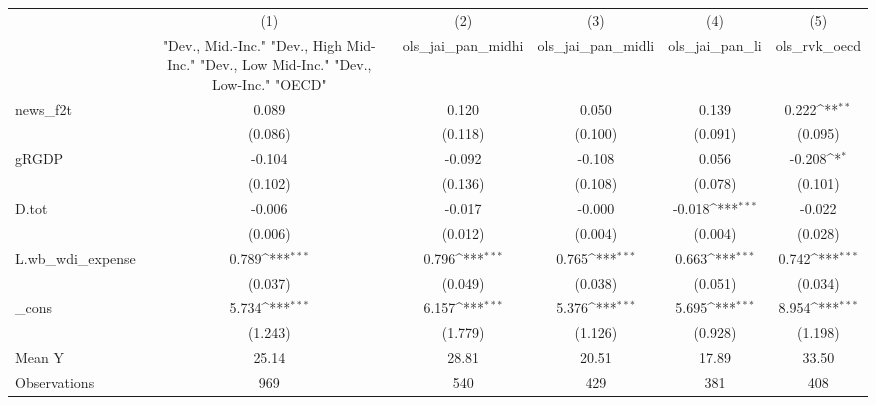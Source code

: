 {
\def\sym#1{\ifmmode^{#1}\else\(^{#1}\)\fi}
\begin{tabular}{l*{5}{c}}
\toprule
            &\multicolumn{1}{c}{(1)}&\multicolumn{1}{c}{(2)}&\multicolumn{1}{c}{(3)}&\multicolumn{1}{c}{(4)}&\multicolumn{1}{c}{(5)}\\
            &\multicolumn{1}{c}{ "Dev., Mid.-Inc." "Dev., High Mid-Inc." "Dev., Low Mid-Inc." "Dev., Low-Inc." "OECD" }&\multicolumn{1}{c}{ols\_jai\_pan\_midhi}&\multicolumn{1}{c}{ols\_jai\_pan\_midli}&\multicolumn{1}{c}{ols\_jai\_pan\_li}&\multicolumn{1}{c}{ols\_rvk\_oecd}\\
\midrule
news\_f2t    &       0.089         &       0.120         &       0.050         &       0.139         &       0.222\sym{**} \\
            &     (0.086)         &     (0.118)         &     (0.100)         &     (0.091)         &     (0.095)         \\
\addlinespace
gRGDP       &      -0.104         &      -0.092         &      -0.108         &       0.056         &      -0.208\sym{*}  \\
            &     (0.102)         &     (0.136)         &     (0.108)         &     (0.078)         &     (0.101)         \\
\addlinespace
D.tot       &      -0.006         &      -0.017         &      -0.000         &      -0.018\sym{***}&      -0.022         \\
            &     (0.006)         &     (0.012)         &     (0.004)         &     (0.004)         &     (0.028)         \\
\addlinespace
L.wb\_wdi\_expense&       0.789\sym{***}&       0.796\sym{***}&       0.765\sym{***}&       0.663\sym{***}&       0.742\sym{***}\\
            &     (0.037)         &     (0.049)         &     (0.038)         &     (0.051)         &     (0.034)         \\
\addlinespace
\_cons      &       5.734\sym{***}&       6.157\sym{***}&       5.376\sym{***}&       5.695\sym{***}&       8.954\sym{***}\\
            &     (1.243)         &     (1.779)         &     (1.126)         &     (0.928)         &     (1.198)         \\
\midrule
Mean Y      &       25.14         &       28.81         &       20.51         &       17.89         &       33.50         \\
Observations&         969         &         540         &         429         &         381         &         408         \\
\bottomrule
\end{tabular}
}
